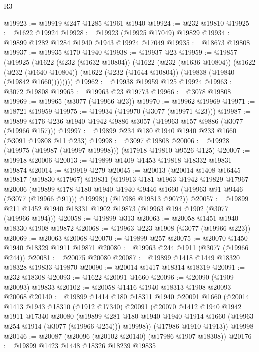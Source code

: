 \begin{lexlean}{R3}
\begin{coremodule}
@19923 := @19919 @247 @1285 @1961 @1940
@19924 := @232 @19810
@19925 := @1622 @19924
@19928 := @19923 (@19925 @17049) @19829
@19934 := @19899 @1282 @1284 @1940 @1943 @19924 @17049
@19935 := @18673 @19808
@19937 := @19935 @170 @1940
@19938 := @19937 @23
@19959 := @19857
    (@19925
      (@1622
        (@232 (@1632 @10804))
        (@1622
          (@232 (@1636 @10804))
          (@1622
            (@232 (@1640 @10804))
            (@1622 (@232 (@1644 @10804)) (@19838 (@19840 (@19842 @1660))))))))
@19962 := @19938 @19959 @125 @19924
@19963 := @3072 @19808
@19965 := @19963 @23 @19773
@19966 := @3078 @19808
@19969 := @19965 (@3077 (@19966 @23))
@19970 := @19962 @19969
@19971 := @18721 @19959
@19975 := @19934 (@19970 (@3077 (@19971 @23)))
@19987 := @19899 @176 @236 @1940 @1942 @9886 @3057 (@19963 @157 @9886 (@3077 (@19966 @157)))
@19997 := @19899 @234 @180 @1940 @1940 @233 @1660 (@3091 @19808 @11 @233)
@19998 := @3097 @19808
@20006 := @19928 (@19975 (@19987 (@19997 @19998))) (@17918 @19810 @9526 @125)
@20007 := @19918 @20006
@20013 := @19899 @1409 @1453 @19818 @18332 @19831 @19874
@20014 := @19919 @279
@20045 := @20013
    (@20014
      @1408
      @16445
      @19817
      (@19830 @17967)
      @19831
      (@19913
        @181
        @1963
        @1942
        @19829
        @17967
        @20006
        (@19899 @178 @180 @1940 @1940 @9446 @1660 (@19963 @91 @9446 (@3077 (@19966 @91))) @19998))
      (@17986 @19813 @9072))
@20057 := @19899 @211 @1452 @1940 @18331 @1902 @19873 (@19963 @194 @1902 (@3077 (@19966 @194)))
@20058 := @19899 @313
@20063 := @20058 @1451 @1940 @18330 @1908 @19872
@20068 := @19963 @223 @1908 (@3077 (@19966 @223))
@20069 := @20063 @20068
@20070 := @19899 @257
@20075 := @20070 @1450 @1940 @18329 @1911 @19871
@20080 := @19963 @244 @1911 (@3077 (@19966 @244))
@20081 := @20075 @20080
@20087 := @19899 @1418 @1449 @18320 @18328 @19833 @19870
@20090 := @20014 @1417 @18314 @18319
@20091 := @232 @18308
@20093 := @1622 @20091 @1660
@20096 := @20090 (@1909 @20093) @19833
@20102 := @20058 @1416 @1940 @18313 @1908 @20093 @20068
@20140 := @19899
    @1414
    @180
    @18311
    @1940
    @20091
    @1660
    (@20014
      @1413
      @1943
      @18310
      (@1912 @17340)
      @20091
      (@20070
        @1412
        @1940
        @1942
        @1911
        @17340
        @20080
        (@19899 @281 @180 @1940 @1940 @1914 @1660 (@19963 @254 @1914 (@3077 (@19966 @254))) @19998))
      (@17986 @1910 @1913))
    @19998
@20146 := @20087 (@20096 (@20102 @20140) (@17986 @1907 @18308))
@20176 := @19899
    @1423
    @1448
    @18326
    @18239
    @19835

\end{coremodule}
\end{lexlean}

